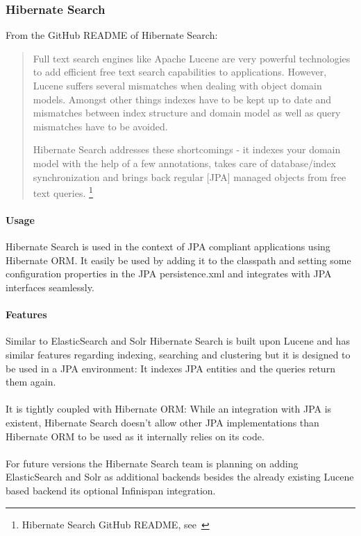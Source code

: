 \pagebreak

\subsubsection{Hibernate Search}

From the GitHub README of Hibernate Search:
\begin{quote}
Full text search engines like Apache Lucene are very powerful technologies to add efficient free text search capabilities to applications. However, Lucene suffers several mismatches when dealing with object domain models. Amongst other things indexes have to be kept up to date and mismatches between index structure and domain model as well as query mismatches have to be avoided.

Hibernate Search addresses these shortcomings - it indexes your domain model with the help of a few annotations, takes care of database/index synchronization and brings back regular [JPA] managed objects from free text queries. \footnote{Hibernate Search GitHub README, see~\cite{hsearch_source_code_git}}
\end{quote}

\paragraph{Usage}
Hibernate Search is used in the context of JPA compliant applications using Hibernate ORM. It easily be used by adding it to the classpath and setting some configuration properties in the JPA persistence.xml and integrates with JPA interfaces seamlessly. 

\paragraph{Features}
Similar to ElasticSearch and Solr Hibernate Search is built upon Lucene and has similar features regarding indexing, searching and clustering but it is designed to be used in a JPA environment: It indexes JPA entities and the queries return them again.
\\\\
It is tightly coupled with Hibernate ORM: While an integration with JPA is existent, Hibernate Search doesn't allow other JPA implementations than Hibernate ORM to be used as it internally relies on its code.
\\\\
For future versions the Hibernate Search team is planning on adding ElasticSearch and Solr as additional backends besides the already existing Lucene based backend its optional Infinispan integration.

